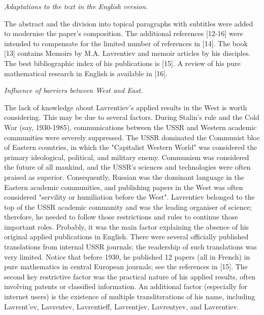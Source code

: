\documentclass[%
 reprint,
onecolumn,
 amsmath,amssymb, aps,
]{revtex4-2}
\numberwithin{equation}{section}
\begin{document}
\vspace{3mm}

\textit{Adaptations to the text in the English version.}
\vspace{1mm}

The abstract and the division into topical paragraphs with subtitles were added to modernise the paper's composition.
The additional references [12-16] were intended to compensate for the limited number of references in [14].
The book [13] contains Memoirs by M.A. Lavrentiev and memoir articles by his disciples.
The best bibliographic index of his publications is [15].
A review of his pure mathematical research in English is available in [16].
\vspace{3mm}

\textit{Influence of barriers between West and East.}
\vspace{1mm}

The lack of knowledge about Lavrentiev's applied results in the West is worth considering.
This may be due to several factors.
During Stalin's rule and the Cold War (say, 1930-1985), communications between the USSR and Western academic communities were severely suppressed.
The USSR dominated the Communist bloc of Eastern countries, in which the "Capitalist Western World" was considered the primary ideological, political, and military enemy.
Communism was considered the future of all mankind, and the USSR's sciences and technologies were often praised as superior.
Consequently, Russian was the dominant language in the Eastern academic communities, and publishing papers in the West was often considered "servility or humiliation before the West".
Lavrentiev belonged to the top of the USSR academic community and was the leading organiser of science; therefore, he needed to follow those restrictions and rules to continue those important roles.
Probably, it was the main factor explaining the absence of his original applied publications in English.
There were several officially published translations from internal USSR journals; the readership of such translations was very limited.
Notice that before 1930, he published  12 papers (all in French) in pure mathematics in central European journals; see the references in [15].
The second key restrictive factor was the practical nature of his applied results, often involving patents or classified information.
An additional factor (especially for internet users) is the existence of multiple transliterations of his name, including Lavrent’ev, Lavrentev, Lavrentieff, Lavrentjev, Lavrentyev, and Lavrentiev.



 
\end{document}

